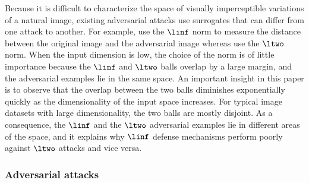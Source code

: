 Because it is difficult to characterize the space of visually imperceptible variations of a natural image, existing adversarial attacks use surrogates that can differ from one attack to another.
For example, \citet{goodfellow2014explaining} use the $\linf$ norm to measure the distance between the original image and the adversarial image whereas \citet{carlini2017towards} use the $\ltwo$ norm.
When the input dimension is low, the choice of the norm is of little importance because the $\linf$ and $\ltwo$ balls overlap by a large margin, and the adversarial examples lie in the same space.
An important insight in this paper is to observe that the overlap between the two balls  diminishes exponentially quickly as the dimensionality of the input space increases.
For typical image datasets with large dimensionality, the two balls are mostly disjoint.
As a consequence, the $\linf$ and the $\ltwo$ adversarial examples lie in different areas of the space, and it explains why $\linf$ defense mechanisms perform poorly against $\ltwo$ attacks and vice versa. 




\subsubsection{Adversarial attacks}
\label{subsubsection:ch2-adversarial_attacks}
 
